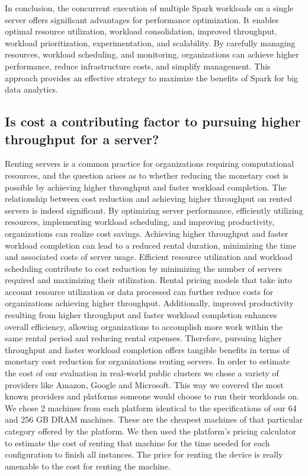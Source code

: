 In conclusion, the concurrent execution of multiple Spark workloads on
a single server offers significant advantages for performance
optimization. It enables optimal resource utilization, workload
consolidation, improved throughput, workload prioritization,
experimentation, and scalability. By carefully managing resources,
workload scheduling, and monitoring, organizations can achieve higher
performance, reduce infrastructure costs, and simplify management.
This approach provides an effective strategy to maximize the benefits
of Spark for big data analytics.

\subsection{Is cost a contributing factor to pursuing higher
throughput for a server?}
Renting servers is a common practice for organizations requiring
computational resources, and the question arises as to whether
reducing the monetary cost is possible by achieving higher throughput
and faster workload completion. The relationship between cost
reduction and achieving higher throughput on rented servers is indeed
significant. By optimizing server performance, efficiently utilizing
resources, implementing workload scheduling, and improving
productivity, organizations can realize cost savings. Achieving higher
throughput and faster workload completion can lead to a reduced rental
duration, minimizing the time and associated costs of server usage.
Efficient resource utilization and workload scheduling contribute to
cost reduction by minimizing the number of servers required and
maximizing their utilization. Rental pricing models that take into
account resource utilization or data processed can further reduce
costs for organizations achieving higher throughput. Additionally,
improved productivity resulting from higher throughput and faster
workload completion enhances overall efficiency, allowing
organizations to accomplish more work within the same rental period
and reducing rental expenses. Therefore, pursuing higher throughput
and faster workload completion offers tangible benefits in terms of
monetary cost reduction for organizations renting servers. In order to
estimate the cost of our evaluation in real-world public clusters we
chose a variety of providers like Amazon, Google and Microsoft. This
way we covered the most known providers and platforms someone would
choose to run their workloads on. We chose 2 machines from each
platform identical to the specifications of our 64 and 256 GB DRAM
machines. These are the cheapest machines of that particular category
offered by the platform. We then used the platform's pricing
calculator to estimate the cost of renting that machine for the time
needed for each configuration to finish all instances. The price for
renting the device is really amenable to the cost for renting the
machine.
